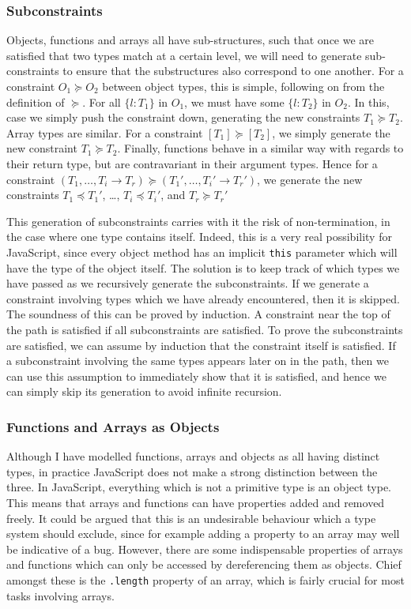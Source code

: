 \documentclass[12pt,a4paper,twoside,openright]{report}
\newcommand*{\js}{\texttt}
\begin{document}
\subsubsection{Subconstraints}
Objects, functions and arrays all have sub-structures, such that once we are
satisfied that two types match at a certain level, we will need to generate
sub-constraints to ensure that the substructures also correspond to one
another. For a constraint $O_1\succeq O_2$ between object types, this is
simple, following on from the definition of $\succeq$. For all $\{l:T_1\}$ in
$O_1$, we must have some $\{l:T_2\}$ in $O_2$. In this, case we simply push the
constraint down, generating the new constraints $T_1\succeq T_2$. Array types
are similar.  For a constraint $[T_1]\succeq[T_2]$, we simply generate the new
constraint $T_1\succeq T_2$. Finally, functions behave in a similar way with
regards to their return type, but are contravariant in their argument types.
Hence for a constraint $(T_1, \ldots, T_i \rightarrow T_r) \succeq(T_1',
\ldots, T_i' \rightarrow T_r')$, we generate the new constraints $T_1\preceq
T_1'$, \dots, $T_i\preceq T_i'$, and $T_r \succeq T_r'$

This generation of subconstraints carries with it the risk of non-termination,
in the case where one type contains itself. Indeed, this is a very real
possibility for JavaScript, since every object method has an implicit \js{this}
parameter which will have the type of the object itself. The solution is to
keep track of which types we have passed as we recursively generate the
subconstraints. If we generate a constraint involving types which we have
already encountered, then it is skipped. The soundness of this can be proved by
induction. A constraint near the top of the path is satisfied if all
subconstraints are satisfied. To prove the subconstraints are satisfied, we can
assume by induction that the constraint itself is satisfied. If a subconstraint
involving the same types appears later on in the path, then we can use this
assumption to immediately show that it is satisfied, and hence we can simply
skip its generation to avoid infinite recursion.

\subsubsection{Functions and Arrays as Objects}

Although I have modelled functions, arrays and objects as all having distinct
types, in practice JavaScript does not make a strong distinction between the
three. In JavaScript, everything which is not a primitive type is an object
type. This means that arrays and functions can have properties added and
removed freely. It could be argued that this is an undesirable behaviour which
a type system should exclude, since for example adding a property to an array
may well be indicative of a bug. However, there are some indispensable
properties of arrays and functions which can only be accessed by dereferencing
them as objects. Chief amongst these is the \js{.length} property of an array,
which is fairly crucial for most tasks involving arrays.
\end{document}
